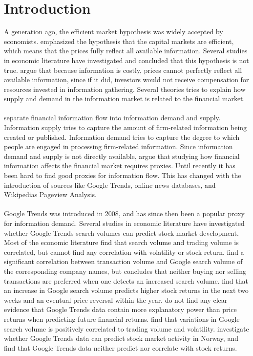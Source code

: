 
\chapter{Introduction}\label{sec:introduction}

A generation ago, the efficient market hypothesis was widely accepted by economists. \cite{fama} emphasized the hypothesis that the capital markets are efficient, which means that the prices fully reflect all available information. Several studies in economic literature have investigated and concluded that this hypothesis is not true. \cite{grossman} argue that because information is costly, prices cannot perfectly reflect all available information, since if it did, investors would  not receive compensation for resources invested in information gathering. Several theories tries to explain how supply and demand in the information market is related to the financial market. 
\\\\
\cite{vlastakis} separate financial information flow into information demand and supply. Information supply tries to capture the amount of firm-related information being created or published. Information demand tries to capture the degree to which people are engaged in processing firm-related information. Since information demand and supply is not directly available, \cite{vlastakis} argue that studying how financial information affects the financial market requires proxies. Until recently it has been hard to find good proxies for information flow. This has changed with the introduction of sources like Google Trends, online news databases, and Wikipedias Pageview Analysis.  
\\\\
Google Trends was introduced in 2008, and has since then been a popular proxy for information demand. Several studies in economic literature have investigated whether Google Trends search volumes can predict stock market development. Most of the economic literature find that search volume and trading volume is correlated, but cannot find any correlation with volatility or stock return. \cite{preis} find a significant correlation between transaction volume and Google search volume of the corresponding company names, but concludes that neither buying nor selling transactions are preferred when one detects an increased search volume. \cite{engelberg} find that an increase in Google search volume predicts higher stock returns in the next two weeks and an eventual price reversal within the year. \cite{challet2014} do not find any clear evidence that Google Trends data contain more explanatory power than price returns when predicting future financial returns. \cite{vlastakis} find that variations in Google search volume is positively correlated to trading volume and volatility. \cite{neri} investigate whether Google Trends data can predict stock market activity in Norway, and find that Google Trends data neither predict nor correlate with stock returns. 
